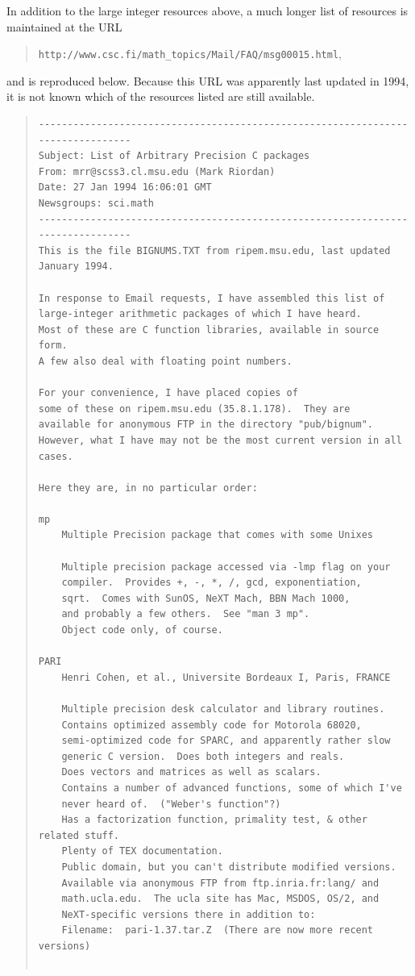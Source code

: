 
In addition to the large integer resources above, a 
much longer list of resources is maintained
at the URL

\begin{quote}
\texttt{http://www.csc.fi/math\_topics/Mail/FAQ/msg00015.html},
\end{quote}

\noindent{}and is reproduced below.  Because this URL was apparently last updated
in 1994, it is not known which of the resources listed are still
available.

\begin{quote}
\begin{scriptsize}
\begin{verbatim}
--------------------------------------------------------------------------------
Subject: List of Arbitrary Precision C packages 
From: mrr@scss3.cl.msu.edu (Mark Riordan) 
Date: 27 Jan 1994 16:06:01 GMT 
Newsgroups: sci.math 
--------------------------------------------------------------------------------
This is the file BIGNUMS.TXT from ripem.msu.edu, last updated January 1994.

In response to Email requests, I have assembled this list of
large-integer arithmetic packages of which I have heard.
Most of these are C function libraries, available in source form.
A few also deal with floating point numbers.  

For your convenience, I have placed copies of
some of these on ripem.msu.edu (35.8.1.178).  They are
available for anonymous FTP in the directory "pub/bignum".
However, what I have may not be the most current version in all cases.

Here they are, in no particular order:

mp
    Multiple Precision package that comes with some Unixes
    
    Multiple precision package accessed via -lmp flag on your
    compiler.  Provides +, -, *, /, gcd, exponentiation,
    sqrt.  Comes with SunOS, NeXT Mach, BBN Mach 1000, 
    and probably a few others.  See "man 3 mp".  
    Object code only, of course.

PARI
    Henri Cohen, et al., Universite Bordeaux I, Paris, FRANCE
    
    Multiple precision desk calculator and library routines.
    Contains optimized assembly code for Motorola 68020, 
    semi-optimized code for SPARC, and apparently rather slow
    generic C version.  Does both integers and reals.
    Does vectors and matrices as well as scalars.
    Contains a number of advanced functions, some of which I've
    never heard of.  ("Weber's function"?)
    Has a factorization function, primality test, & other related stuff.
    Plenty of TEX documentation.
    Public domain, but you can't distribute modified versions.
    Available via anonymous FTP from ftp.inria.fr:lang/ and 
    math.ucla.edu.  The ucla site has Mac, MSDOS, OS/2, and
    NeXT-specific versions there in addition to:
    Filename:  pari-1.37.tar.Z  (There are now more recent versions)
    

\end{verbatim}
\end{scriptsize}
\end{quote}
